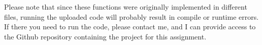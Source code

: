 \documentclass[a4paper]{article}
\begin{document}
Please note that since these functions were originally implemented in different files, running the uploaded code will probably result in compile or runtime errors. If there you need to run the code, please contact me, and I can provide access to the Github repository containing the project for this assignment.









%
%
\end{document}
